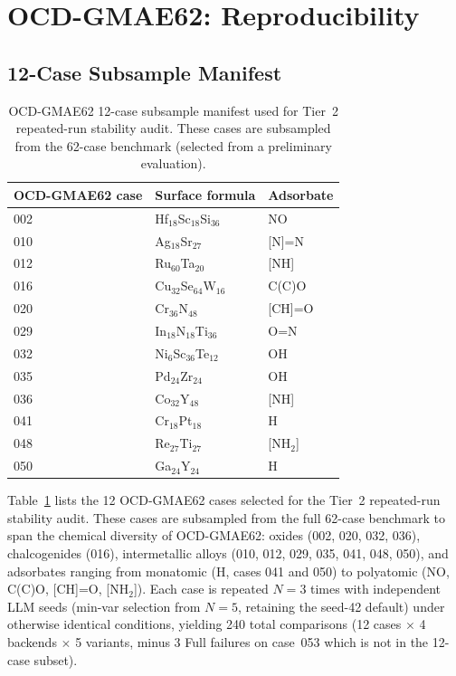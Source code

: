 \documentclass[%
 preprint,
 superscriptaddress,
 amsmath,amssymb,
 aps,
 prb,
 floatfix,
]{revtex4-2}
\begin{document}


\section{OCD-GMAE62: Reproducibility}

\subsection{12-Case Subsample Manifest}

\begin{table}[ht]
\centering
\caption{OCD-GMAE62 12-case subsample manifest used for Tier~2 repeated-run stability audit. These cases are subsampled from the 62-case benchmark (selected from a preliminary evaluation).}
\label{tab:si-ocd62-manifest}
\begin{tabular}{lll}
\toprule
OCD-GMAE62 case & Surface formula & Adsorbate \\
\midrule
002 & Hf$_{18}$Sc$_{18}$Si$_{36}$ & NO \\
010 & Ag$_{18}$Sr$_{27}$ & [N]=N \\
012 & Ru$_{60}$Ta$_{20}$ & [NH] \\
016 & Cu$_{32}$Se$_{64}$W$_{16}$ & C(C)O \\
020 & Cr$_{36}$N$_{48}$ & [CH]=O \\
029 & In$_{18}$N$_{18}$Ti$_{36}$ & O=N \\
032 & Ni$_6$Sc$_{36}$Te$_{12}$ & OH \\
035 & Pd$_{24}$Zr$_{24}$ & OH \\
036 & Co$_{32}$Y$_{48}$ & [NH] \\
041 & Cr$_{18}$Pt$_{18}$ & H \\
048 & Re$_{27}$Ti$_{27}$ & [NH$_2$] \\
050 & Ga$_{24}$Y$_{24}$ & H \\
\bottomrule
\end{tabular}
\end{table}

Table~\ref{tab:si-ocd62-manifest} lists the 12 OCD-GMAE62 cases selected for the Tier~2 repeated-run stability audit. These cases are subsampled from the full 62-case benchmark to span the chemical diversity of OCD-GMAE62: oxides (002, 020, 032, 036), chalcogenides (016), intermetallic alloys (010, 012, 029, 035, 041, 048, 050), and adsorbates ranging from monatomic (H, cases 041 and 050) to polyatomic (NO, C(C)O, [CH]=O, [NH$_2$]). Each case is repeated $N=3$ times with independent LLM seeds (min-var selection from $N=5$, retaining the seed-42 default) under otherwise identical conditions, yielding 240 total comparisons (12 cases $\times$ 4 backends $\times$ 5 variants, minus 3 Full failures on case~053 which is not in the 12-case subset).
\end{document}
